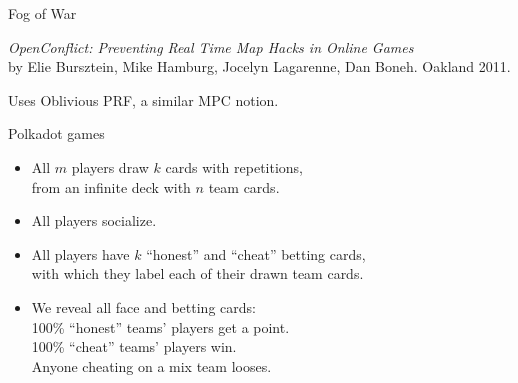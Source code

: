 \documentclass[fleqn,xcolor={usenames,dvipsnames},notes,aspectratio=169]{beamer} %
\begin{document}
\begin{frame}{Fog of War}

\medskip

{\em OpenConflict: Preventing Real Time Map Hacks in Online Games} \\
by Elie Bursztein, Mike Hamburg, Jocelyn Lagarenne, Dan Boneh.
Oakland 2011.

\bigskip

Uses Oblivious PRF, a similar MPC notion.  

\end{frame}



\begin{frame}{Polkadot games}

\begin{itemize}
\item All $m$ players draw $k$ cards with repetitions, \\ 
      from an infinite deck with $n$ team cards. \\
\item All players socialize. 
\item All players have $k$ ``honest'' and ``cheat'' betting cards, \\
      with which they label each of their drawn team cards.
\item We reveal all face and betting cards: \\
\hspace*{5pt}  100\% ``honest'' teams' players get a point. \\
\hspace*{5pt}  100\% ``cheat'' teams' players win. \\
\hspace*{5pt}  Anyone cheating on a mix team looses. \\
\end{itemize}

\end{frame}



\end{document}
